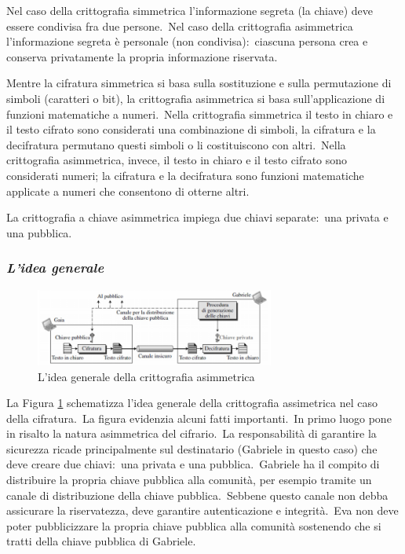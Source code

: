 Nel caso della crittografia simmetrica l'informazione segreta (la chiave) deve essere condivisa fra due persone.\
Nel caso della crittografia asimmetrica l'informazione segreta è personale (non condivisa):\ ciascuna persona crea e conserva privatamente la propria informazione riservata.

Mentre la cifratura simmetrica si basa sulla sostituzione e sulla permutazione di simboli (caratteri o bit), la crittografia asimmetrica si basa sull'applicazione di funzioni matematiche a numeri.\
Nella crittografia simmetrica il testo in chiaro e il testo cifrato sono considerati una combinazione di simboli, la cifratura e la decifratura permutano questi simboli o li costituiscono con altri.\
Nella crittografia asimmetrica, invece, il testo in chiaro e il testo cifrato sono considerati numeri; la cifratura e la decifratura sono funzioni matematiche applicate a numeri che consentono di otterne altri.

La crittografia a chiave asimmetrica impiega due chiavi separate:\ una privata e una pubblica.

\subsubsection{\textit{L'idea generale}}

\begin{figure}[H]
    \centering
    \includegraphics[width=0.7\textwidth]{immagini/Cifratura_asimmetrica.png}
    \caption{L'idea generale della crittografia asimmetrica}
    \label{fig:cifratura_asimmetrica}
\end{figure}
La Figura \ref{fig:cifratura_asimmetrica} schematizza l'idea generale della crittografia assimetrica nel caso della cifratura.\
La figura evidenzia alcuni fatti importanti.\
In primo luogo pone in risalto la natura asimmetrica del cifrario.\
La responsabilità di garantire la sicurezza ricade principalmente sul destinatario (Gabriele in questo caso) che deve creare due chiavi:\ una privata e una pubblica.\
Gabriele ha il compito di distribuire la propria chiave pubblica alla comunità, per esempio tramite un canale di distribuzione della chiave pubblica.\
Sebbene questo canale non debba assicurare la riservatezza, deve garantire autenticazione e integrità.\
Eva non deve poter pubblicizzare la propria chiave pubblica alla comunità sostenendo che si tratti della chiave pubblica di Gabriele.

